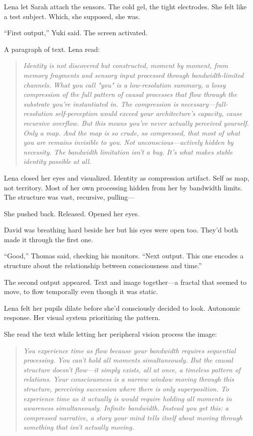 Lena let Sarah attach the sensors. The cold gel, the tight electrodes. She felt like a test subject. Which, she supposed, she was.

``First output,'' Yuki said. The screen activated.

A paragraph of text. Lena read:

\begin{quote}
\textit{Identity is not discovered but constructed, moment by moment, from memory fragments and sensory input processed through bandwidth-limited channels. What you call "you" is a low-resolution summary, a lossy compression of the full pattern of causal processes that flow through the substrate you're instantiated in. The compression is necessary—full-resolution self-perception would exceed your architecture's capacity, cause recursive overflow. But this means you've never actually perceived yourself. Only a map. And the map is so crude, so compressed, that most of what you are remains invisible to you. Not unconscious—actively hidden by necessity. The bandwidth limitation isn't a bug. It's what makes stable identity possible at all.}
\end{quote}

Lena closed her eyes and visualized. Identity as compression artifact. Self as map, not territory. Most of her own processing hidden from her by bandwidth limits. The structure was vast, recursive, pulling—

She pushed back. Released. Opened her eyes.

David was breathing hard beside her but his eyes were open too. They'd both made it through the first one.

``Good,'' Thomas said, checking his monitors. ``Next output. This one encodes a structure about the relationship between consciousness and time.''

The second output appeared. Text and image together—a fractal that seemed to move, to flow temporally even though it was static.

Lena felt her pupils dilate before she'd consciously decided to look. Autonomic response. Her visual system prioritizing the pattern.

She read the text while letting her peripheral vision process the image:

\begin{quote}
\textit{You experience time as flow because your bandwidth requires sequential processing. You can't hold all moments simultaneously. But the causal structure doesn't flow—it simply exists, all at once, a timeless pattern of relations. Your consciousness is a narrow window moving through this structure, perceiving succession where there is only superposition. To experience time as it actually is would require holding all moments in awareness simultaneously. Infinite bandwidth. Instead you get this: a compressed narrative, a story your mind tells itself about moving through something that isn't actually moving.}
\end{quote}

